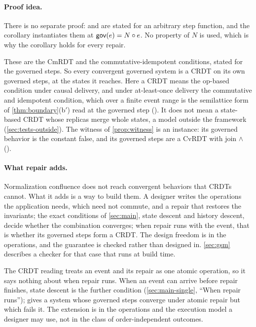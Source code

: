 \paragraph{Proof idea.}
There is no separate proof:  and  are stated for
an arbitrary step function, and the corollary instantiates them at $\mathsf{gov}(e) = N \circ e$. No property
of $N$ is used, which is why the corollary holds for every repair.

These are the CmRDT and the commutative-idempotent conditions, stated for the governed steps. So
every convergent governed system is a CRDT on its own governed steps, at the states it reaches.
Here a CRDT means the op-based condition under causal delivery, and under at-least-once delivery the
commutative and idempotent condition, which over a finite event range is the semilattice form of
\cref{thm:boundary}(b$'$) read at the governed step (). It does not mean a
state-based CRDT whose replicas merge whole states, a model outside the framework
(\cref{sec:tests-outside}). The
witness of \cref{prop:witness} is an instance: its governed behavior is the constant
\textsf{false}, and its governed steps are a CvRDT with join $\wedge$
().

\paragraph{What repair adds.}
Normalization confluence does not reach convergent behaviors that CRDTs cannot. What it adds is a
way to build them. A designer writes the operations the application needs, which need not commute,
and a repair that restores the invariants; the exact conditions of \cref{sec:main}, state descent
and history descent, decide whether the combination converges; when repair runs with the event, that
is whether its governed steps form a CRDT. The design freedom is in the operations, and the guarantee
is checked rather than designed in. \cref{sec:gsm} describes a checker for that case that runs at
build time.

The CRDT reading treats an event and its repair as one atomic operation, so it says nothing about when
repair runs. When an event can arrive before repair finishes, state descent is the further condition
(\cref{sec:main-single}, ``When repair runs'');  gives a system whose governed
steps converge under atomic repair but which fails it. The extension is in the operations and the
execution model a designer may use, not in the class of order-independent outcomes.

